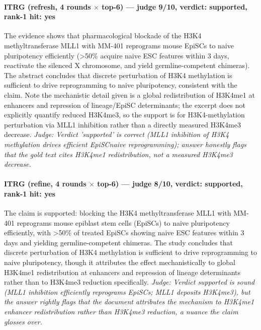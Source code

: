\documentclass[sigconf, review, anonymous]{acmart}
\begin{document}
\paragraph{ITRG (refresh, 4 rounds $\times$ top-6) --- judge 9/10, verdict: supported, rank-1 hit: yes}
\noindent The evidence shows that pharmacological blockade of the H3K4 methyltransferase MLL1 with MM-401 reprograms mouse EpiSCs to naive pluripotency efficiently (>50\% acquire naive ESC features within 3 days, reactivate the silenced X chromosome, and yield germline-competent chimeras). The abstract concludes that discrete perturbation of H3K4 methylation is sufficient to drive reprogramming to naive pluripotency, consistent with the claim. Note the mechanistic detail given is a global redistribution of H3K4me1 at enhancers and repression of lineage/EpiSC determinants; the excerpt does not explicitly quantify reduced H3K4me3, so the support is for H3K4-methylation perturbation via MLL1 inhibition rather than a directly measured H3K4me3 decrease.
\noindent\small\textit{Judge: Verdict 'supported' is correct (MLL1 inhibition of H3K4 methylation drives efficient EpiSCnaive reprogramming); answer honestly flags that the gold text cites H3K4me1 redistribution, not a measured H3K4me3 decrease.}
\paragraph{ITRG (refine, 4 rounds $\times$ top-6) --- judge 8/10, verdict: supported, rank-1 hit: yes}
\noindent The claim is supported: blocking the H3K4 methyltransferase MLL1 with MM-401 reprograms mouse epiblast stem cells (EpiSCs) to naive pluripotency efficiently, with >50\% of treated EpiSCs showing naive ESC features within 3 days and yielding germline-competent chimeras. The study concludes that discrete perturbation of H3K4 methylation is sufficient to drive reprogramming to naive pluripotency, though it attributes the effect mechanistically to global H3K4me1 redistribution at enhancers and repression of lineage determinants rather than to H3K4me3 reduction specifically.
\noindent\small\textit{Judge: Verdict supported is sound (MLL1 inhibition efficiently reprograms EpiSCs; MLL1 deposits H3K4me3), but the answer rightly flags that the document attributes the mechanism to H3K4me1 enhancer redistribution rather than H3K4me3 reduction, a nuance the claim glosses over.}
\end{document}
